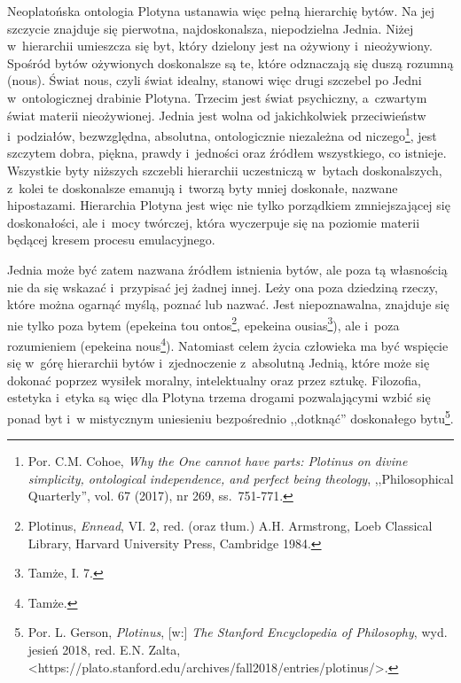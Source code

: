 Neoplatońska ontologia Plotyna ustanawia więc pełną hierarchię bytów. Na jej szczycie znajduje się pierwotna, najdoskonalsza, niepodzielna Jednia. Niżej w~hierarchii umieszcza się byt, który dzielony jest na ożywiony i~nieożywiony. Spośród bytów ożywionych doskonalsze są te, które odznaczają się duszą rozumną (nous). Świat nous, czyli świat idealny, stanowi więc drugi szczebel po Jedni w~ontologicznej drabinie Plotyna. Trzecim jest świat psychiczny, a~czwartym świat materii nieożywionej. Jednia jest wolna od jakichkolwiek przeciwieństw i~podziałów, bezwzględna, absolutna, ontologicznie niezależna od niczego\footnote{ Por. C.M. Cohoe, \textit{Why the One cannot have parts: Plotinus on divine simplicity, ontological independence, and perfect being theology}, ,,Philosophical Quarterly'', vol. 67 (2017), nr 269, ss.~751-771.}, jest szczytem dobra, piękna, prawdy i~jedności oraz źródłem wszystkiego, co istnieje. Wszystkie byty niższych szczebli hierarchii uczestniczą w~bytach doskonalszych, z~kolei te doskonalsze emanują i~tworzą byty mniej doskonałe, nazwane hipostazami. Hierarchia Plotyna jest więc nie tylko porządkiem zmniejszającej się doskonałości, ale i~mocy twórczej, która wyczerpuje się na poziomie materii będącej kresem procesu emulacyjnego.

Jednia może być zatem nazwana źródłem istnienia bytów, ale poza tą własnością nie da się wskazać i~przypisać jej żadnej innej. Leży ona poza dziedziną rzeczy, które można ogarnąć myślą, poznać lub nazwać. Jest niepoznawalna, znajduje się nie tylko poza bytem (epekeina tou ontos\footnote{ Plotinus, \textit{Ennead}, VI. 2, red. (oraz tłum.) A.H. Armstrong, Loeb Classical Library, Harvard University Press, Cambridge 1984.}, epekeina ousias\footnote{ Tamże, I. 7.}), ale i~poza rozumieniem (epekeina nous\footnote{ Tamże.}). Natomiast celem życia człowieka ma być wspięcie się w~górę hierarchii bytów i~zjednoczenie z~absolutną Jednią, które może się dokonać poprzez wysiłek moralny, intelektualny oraz przez sztukę. Filozofia, estetyka i~etyka są więc dla Plotyna trzema drogami pozwalającymi wzbić się ponad byt i~w mistycznym uniesieniu bezpośrednio ,,dotknąć'' doskonałego bytu\footnote{ Por. L. Gerson, \textit{Plotinus}, [w:] \textit{The Stanford Encyclopedia of Philosophy}, wyd. jesień 2018, red. E.N. Zalta, {\textless}https://plato.stanford.edu/archives/fall2018/entries/plotinus/{\textgreater}.}.

